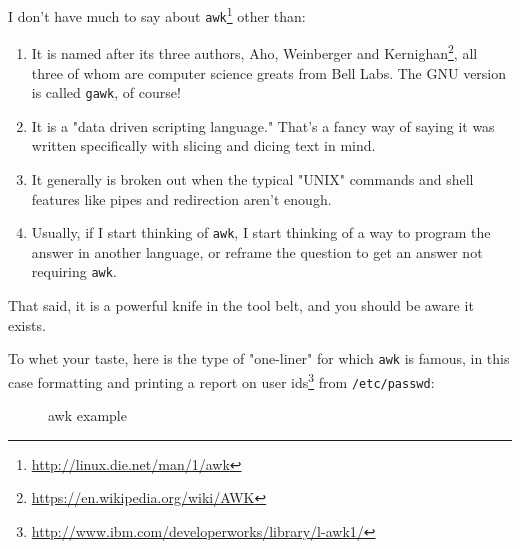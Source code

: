 \documentclass[10pt,american,]{book}
\makeatletter
\newenvironment{Shaded}{\begin{snugshade}}{\end{snugshade}}
\newcommand{\KeywordTok}[1]{\textcolor[rgb]{0.13,0.29,0.53}{\textbf{{#1}}}}
\newcommand{\StringTok}[1]{\textcolor[rgb]{0.31,0.60,0.02}{{#1}}}
\newcommand{\NormalTok}[1]{{#1}}
\renewcommand{\href}[2]{#2\footnote{\url{#1}}}
\numberwithin{figure}{chapter}
\DeclareRobustCommand{\drcap}[1]{\begin{figure}[H]\caption{#1}\end{figure}}
\DeclareRobustCommand{\drcmd}[1]{\index{Commands!#1@\texttt{#1}}}
\renewcommand{\KeywordTok}[1]{{#1}}
\renewcommand{\StringTok}[1]{{#1}}
\renewcommand{\NormalTok}[1]{{#1}}
\makeatother
\begin{document}
I don't have much to say about
\href{http://linux.die.net/man/1/awk}{\texttt{awk}}\drcmd{awk} other
than:

\begin{enumerate}
\def\labelenumi{\arabic{enumi}.}
\item
  It is named after its three authors,
  \href{https://en.wikipedia.org/wiki/AWK}{Aho, Weinberger and
  Kernighan}, all three of whom are computer science greats from Bell
  Labs. The GNU version is called \texttt{gawk}, of course!
\item
  It is a "data driven scripting language." That's a fancy way of saying
  it was written specifically with slicing and dicing text in mind.
\item
  It generally is broken out when the typical "UNIX" commands and shell
  features like pipes and redirection aren't enough.
\item
  Usually, if I start thinking of \texttt{awk}, I start thinking of a
  way to program the answer in another language, or reframe the question
  to get an answer not requiring \texttt{awk}.
\end{enumerate}

That said, it is a powerful knife in the tool belt, and you should be
aware it exists.

To whet your taste, here is the type of "one-liner" for which
\texttt{awk} is famous, in this case
\href{http://www.ibm.com/developerworks/library/l-awk1/}{formatting and
printing a report on user ids} from \texttt{/etc/passwd}:

\drcap{awk example}

\begin{Shaded}
\end{Shaded}
\end{document}
